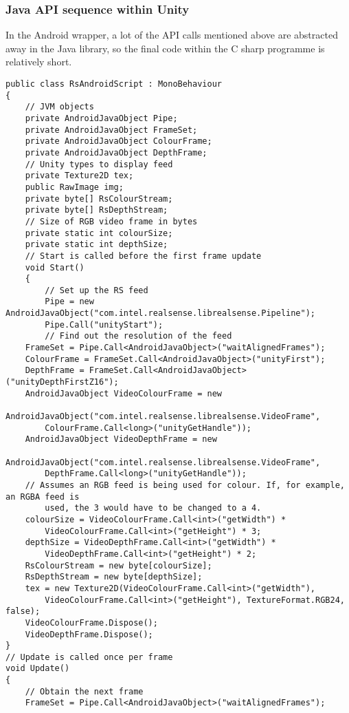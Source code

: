     \subsubsection{Java API sequence within Unity}
    In the Android wrapper, a lot of the API calls mentioned above are abstracted away in the Java library, so the final code within the C sharp programme is relatively short.

    \begin{lstlisting}[style=CSharpStyle]
public class RsAndroidScript : MonoBehaviour
{
    // JVM objects
    private AndroidJavaObject Pipe;
    private AndroidJavaObject FrameSet;
    private AndroidJavaObject ColourFrame;
    private AndroidJavaObject DepthFrame;
    // Unity types to display feed
    private Texture2D tex;
    public RawImage img;
    private byte[] RsColourStream;
    private byte[] RsDepthStream;
    // Size of RGB video frame in bytes
    private static int colourSize;
    private static int depthSize;
    // Start is called before the first frame update
    void Start()
    {
        // Set up the RS feed
        Pipe = new AndroidJavaObject("com.intel.realsense.librealsense.Pipeline");
        Pipe.Call("unityStart");
        // Find out the resolution of the feed
    FrameSet = Pipe.Call<AndroidJavaObject>("waitAlignedFrames");
    ColourFrame = FrameSet.Call<AndroidJavaObject>("unityFirst");
    DepthFrame = FrameSet.Call<AndroidJavaObject>("unityDepthFirstZ16");
    AndroidJavaObject VideoColourFrame = new
        AndroidJavaObject("com.intel.realsense.librealsense.VideoFrame",
        ColourFrame.Call<long>("unityGetHandle"));
    AndroidJavaObject VideoDepthFrame = new
        AndroidJavaObject("com.intel.realsense.librealsense.VideoFrame",
        DepthFrame.Call<long>("unityGetHandle"));
    // Assumes an RGB feed is being used for colour. If, for example, an RGBA feed is
        used, the 3 would have to be changed to a 4.
    colourSize = VideoColourFrame.Call<int>("getWidth") *
        VideoColourFrame.Call<int>("getHeight") * 3;
    depthSize = VideoDepthFrame.Call<int>("getWidth") *
        VideoDepthFrame.Call<int>("getHeight") * 2;
    RsColourStream = new byte[colourSize];
    RsDepthStream = new byte[depthSize];
    tex = new Texture2D(VideoColourFrame.Call<int>("getWidth"),
        VideoColourFrame.Call<int>("getHeight"), TextureFormat.RGB24, false);
    VideoColourFrame.Dispose();
    VideoDepthFrame.Dispose();
}
// Update is called once per frame
void Update()
{
    // Obtain the next frame
    FrameSet = Pipe.Call<AndroidJavaObject>("waitAlignedFrames");

\end{lstlisting}
